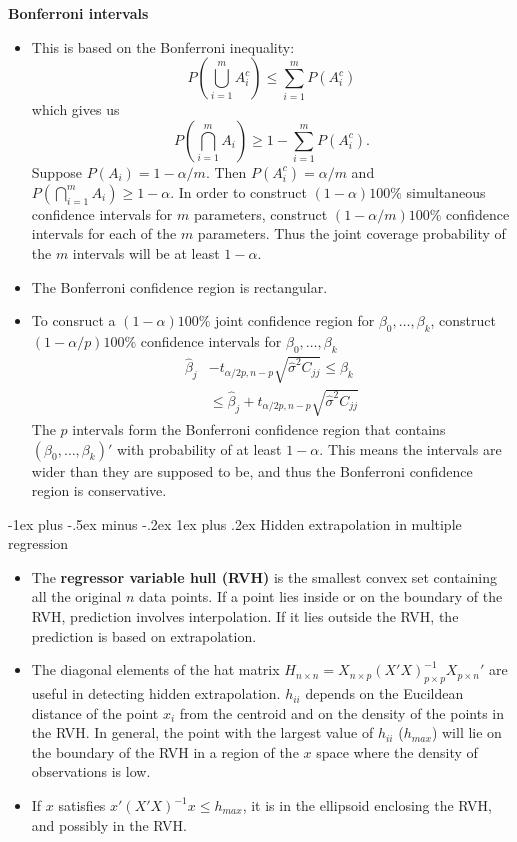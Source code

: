 \documentclass[frenchspacing,9pt,landscape,a4paper]{article}
\makeatletter
\renewcommand{\subsubsection}{\@startsection{subsubsection}{3}{0mm}%
                                {-1ex plus -.5ex minus -.2ex}%
                                {1ex plus .2ex}%
                                {\normalfont\small\bfseries}}
\makeatother
\begin{document}
\begin{multicols}{3}
\textbf{Bonferroni intervals} 
		\begin{itemize}
			\item This is based on the Bonferroni inequality:
		\[
			P\left(\bigcup_{i=1}^m A_i^c\right)\leq\sum_{i=1}^m P(A_i^c)
		\] which gives us
		\[
			P\left(\bigcap_{i=1}^m A_i\right)\geq 1-\sum_{i=1}^m P(A_i^c)
		.\] Suppose $P(A_i)=1-\alpha /m$. Then  $P(A_i^c)=\alpha /m$ and  $P\left(\bigcap_{i=1}^m A_i\right)\geq 1-\alpha$. In order to construct  $(1-\alpha)100\%$ simultaneous confidence intervals for  $m$ parameters, construct  $(1-\alpha/m)100\%$ confidence intervals for each of the $m$ parameters. Thus the joint coverage probability of the  $m$ intervals will be at least  $1-\alpha$.
			\item The Bonferroni confidence region is rectangular.
			\item To consruct a $(1-\alpha)100\%$ joint confidence region for  $\beta_0,\dots,\beta_k$, construct $(1-\alpha /p)100\%$ confidence intervals for  $\beta_0,\dots,\beta_k$
				\begin{align*}
					\hat{\beta}_j&-t_{\alpha /2p,n-p}\sqrt{\hat{\sigma}^2 C_{jj}}\leq\beta_k\\
								 &\leq\hat{\beta}_j+t_{\alpha /2p,n-p}\sqrt{\hat{\sigma}^2 C_{jj}}
				\end{align*} The $p$ intervals form the Bonferroni confidence region that contains  $(\beta_0,\dots,\beta_k)'$ with probability of at least $1-\alpha$. This means the intervals are wider than they are supposed to be, and thus the Bonferroni confidence region is conservative.
		\end{itemize}

\subsubsection{Hidden extrapolation in multiple regression}
\begin{itemize}
	\item The \textbf{regressor variable hull (RVH)} is the smallest convex set containing all the original $n$ data points. If a point lies inside or on the boundary of the RVH, prediction involves interpolation. If it lies outside the RVH, the prediction is based on extrapolation.
	\item The diagonal elements of the hat matrix  $H_{n\times n}=X_{n\times p}(X'X)^{-1}_{p\times p}X_{p\times n}'$ are useful in detecting hidden extrapolation. $h_{ii}$ depends on the Eucildean distance of the point  $x_i$ from the centroid and on the density of the points in the RVH. In general, the point with the largest value of  $h_{ii}$ ($h_{max}$) will lie on the boundary of the RVH in a region of the  $x$ space where the density of observations is low.
	\item If $x$ satisfies $x'(X'X)^{-1}x\leq h_{max}$, it is in the ellipsoid enclosing the RVH, and possibly in the RVH.
\end{itemize}

\end{multicols}
\end{document}
